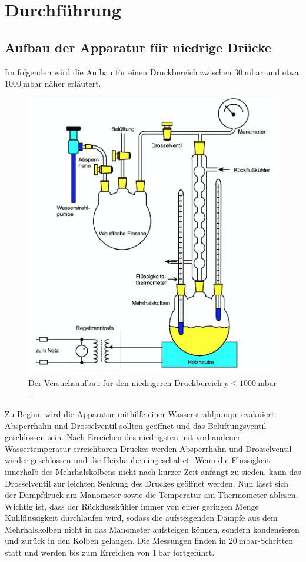 \section{Durchführung}
  \subsection{Aufbau der Apparatur für niedrige Drücke}
    Im folgenden wird die Aufbau für einen Druckbereich zwischen $\SI{30}{\milli\bar}$ und etwa $\SI{1000}{\milli\bar}$ näher
    erläutert.
    \begin{figure}
      \centering
      \includegraphics[scale=0.5]{Content/apparaturniedrige.png}
      \caption{Der Versuchsaufbau für den niedrigeren Druckbereich $p \leq \SI{1000}{\milli\bar}$.}
      \label{fig:niedrigedrücke}
    \end{figure}
    Zu Beginn wird die Apparatur mithilfe einer Wasserstrahlpumpe evakuiert. Absperrhahn und Drosselventil sollten geöffnet und
    das Belüftungsventil geschlossen sein. Nach Erreichen des niedrigsten mit vorhandener Wassertemperatur erreichbaren Druckes
    werden Absperrhahn und Drosselventil wieder geschlossen und die Heizhaube eingeschaltet. Wenn die Flüssigkeit innerhalb
    des Mehrhalskolbens nicht nach kurzer Zeit anfängt zu sieden, kann das Drosselventil zur leichten Senkung des Druckes
    geöffnet werden. Nun lässt sich der Dampfdruck am Manometer sowie die Temperatur am Thermometer ablesen. Wichtig ist, dass
    der Rückflusskühler immer von einer geringen Menge Kühlflüssigkeit durchlaufen wird, sodass die aufsteigenden Dämpfe aus dem
    Mehrhalskolben nicht in das Manometer aufsteigen können, sondern kondensieren und zurück in den Kolben gelangen.
    Die Messungen finden in $\SI{20}{\milli\bar}$-Schritten statt und werden bis zum Erreichen von $\SI{1}{\bar}$ fortgeführt.

